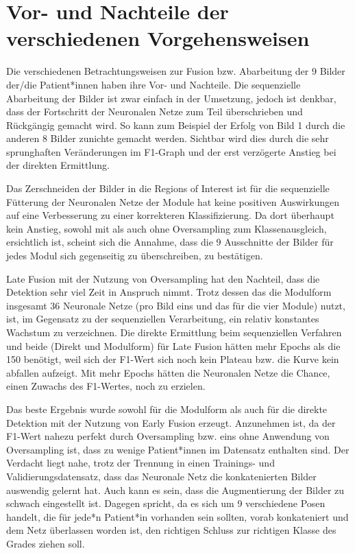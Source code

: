 \clearpage
\section{Vor- und Nachteile der verschiedenen Vorgehensweisen}\label{early_vs_late}
Die verschiedenen Betrachtungsweisen zur Fusion bzw. Abarbeitung der 9 Bilder der/die Patient*innen haben ihre Vor- und Nachteile. Die sequenzielle Abarbeitung der Bilder ist zwar einfach in der Umsetzung, jedoch ist denkbar, dass der Fortschritt der Neuronalen Netze zum Teil überschrieben und Rückgängig gemacht wird. So kann zum Beispiel der Erfolg von Bild 1 durch die anderen 8 Bilder zunichte gemacht werden. Sichtbar wird dies durch die sehr sprunghaften Veränderungen im F1-Graph und der erst verzögerte Anstieg bei der direkten Ermittlung.

Das Zerschneiden der Bilder in die Regions of Interest ist für die sequenzielle Fütterung der Neuronalen Netze der Module hat keine positiven Auswirkungen auf eine Verbesserung zu einer korrekteren Klassifizierung. Da dort überhaupt kein Anstieg, sowohl mit als auch ohne Oversampling zum Klassenausgleich, ersichtlich ist, scheint sich die Annahme, dass die 9 Ausschnitte der Bilder für jedes Modul sich gegenseitig zu überschreiben, zu bestätigen.

Late Fusion mit der Nutzung von Oversampling hat den Nachteil, dass die Detektion sehr viel Zeit in Anspruch nimmt. Trotz dessen das die Modulform insgesamt 36 Neuronale Netze (pro Bild eins und das für die vier Module) nutzt, ist, im Gegensatz zu der sequenziellen Verarbeitung, ein relativ konstantes Wachstum zu verzeichnen. Die direkte Ermittlung beim sequenziellen Verfahren und beide (Direkt und Modulform) für Late Fusion hätten mehr Epochs als die 150 benötigt, weil sich der F1-Wert sich noch kein Plateau bzw. die Kurve kein abfallen aufzeigt. Mit mehr Epochs hätten die Neuronalen Netze die Chance, einen Zuwachs des F1-Wertes, noch zu erzielen.

Das beste Ergebnis wurde sowohl für die Modulform als auch für die direkte Detektion mit der Nutzung von Early Fusion erzeugt. Anzunehmen ist, da der F1-Wert nahezu perfekt durch Oversampling bzw. eins ohne Anwendung von Oversampling ist, dass zu wenige Patient*innen im Datensatz enthalten sind. Der Verdacht liegt nahe, trotz der Trennung in einen Trainings- und Validierungsdatensatz, dass das Neuronale Netz die konkatenierten Bilder auswendig gelernt hat. Auch kann es sein, dass die Augmentierung der Bilder zu schwach eingestellt ist. Dagegen spricht, da es sich um 9 verschiedene Posen handelt, die für jede*n Patient*in vorhanden sein sollten, vorab konkateniert und dem Netz überlassen worden ist, den richtigen Schluss zur richtigen Klasse des Grades ziehen soll.

